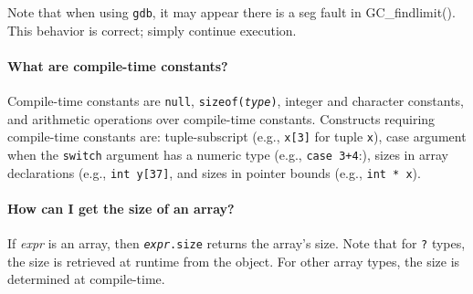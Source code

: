 Note that when using \texttt{gdb}, it may appear there is a seg fault
in GC_findlimit().  This behavior is correct; simply continue
execution.

\paragraph{What are compile-time constants?}

Compile-time constants are \texttt{null},
\texttt{sizeof(\textit{type})}, integer and character constants, and
arithmetic operations over compile-time constants.  Constructs
requiring compile-time constants are: tuple-subscript (e.g.,
\texttt{x[3]} for tuple \texttt{x}), case argument when the
\texttt{switch} argument has a numeric type (e.g., \texttt{case
  3+4}:), sizes in array declarations (e.g., \texttt{int y[37]}, and
sizes in pointer bounds (e.g., \texttt{int * x\rb}).

\paragraph{How can I get the size of an array?}

If \textit{expr} is an array, then \texttt{{\it expr}.size} returns
the array's size.  Note that for \texttt{?} types, the size is
retrieved at runtime from the object.  For other array types,
the size is determined at compile-time.

  
